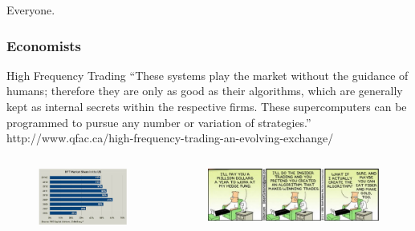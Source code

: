 \documentclass{beamer}
\begin{document}
\begin{frame}
  \center Everyone.
\end{frame}

\begin{frame}
  \frametitle{Economists}
  \center High Frequency Trading
  \center ``These systems play the market without the guidance
  of humans; therefore they are only as good as their algorithms, which are
  generally kept as internal secrets within the respective firms. These
  supercomputers can be programmed to pursue any number or variation of
  strategies.''
  {\small http://www.qfac.ca/high-frequency-trading-an-evolving-exchange/ }
  \begin{columns}
    \begin{column}{0.5\textwidth}
      \begin{figure} \centering
	\includegraphics[width=.9\textwidth]{figs/hft/market-share.jpg}
      \end{figure}
    \end{column}
    \begin{column}{0.5\textwidth}
      \begin{figure} \centering
	\includegraphics[width=.9\textwidth]{figs/hft/High-Frequency-Trading.jpg}
      \end{figure}
    \end{column}
  \end{columns}
\end{frame}
\end{document}

